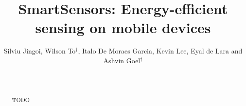 \documentclass{sig-alternate-10pt}
\begin{document}
\date{}


\title{SmartSensors: Energy-efficient sensing on mobile devices}
\author{Silviu Jingoi, Wilson To$^\dagger$, Italo De Moraes Garcia, Kevin Lee, Eyal de Lara and Ashvin Goel$^\dagger$ \\
  \\  \\ }
\maketitle


\begin{abstract}
TODO
\end{abstract}







% 









\end{document}
